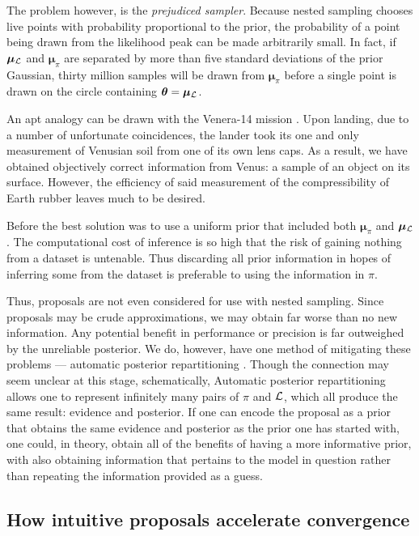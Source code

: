 \documentclass[draft,usenatbib]{mnras}
\begin{document}
The problem however, is the \emph{prejudiced sampler}. Because
nested sampling chooses live points with probability proportional
to the prior, the probability of a point being drawn from the
likelihood peak can be made arbitrarily small. In fact, if
\(\bm{\mu}_{{\cal L}}\) and \(\bm{\mu}_{\pi}\) are separated by more
than five standard deviations of the prior Gaussian, thirty million
samples will be drawn from \(\bm{\mu}_{\pi}\) before a single point
is drawn on the circle containing \(\bm{\theta} = \bm{\mu}_{{\cal
   L}}\).

An apt analogy can be drawn with the Venera-14 mission
\citep{siddiqi2018beyond}. Upon landing, due to a number of
unfortunate coincidences, the lander took its one and only
measurement of Venusian soil from one of its own lens caps. As a
result, we have obtained objectively correct information from
Venus: a sample of an object on its surface. However, the
efficiency of said measurement of the compressibility of Earth
rubber leaves much to be desired.

Before \cite{chen-ferroz-hobson} the best solution was to use a
uniform prior that included both \(\bm{\mu}_{\pi}\) and
\(\bm{\mu}_{{\cal L}}\). The computational cost of inference is so
high that the risk of gaining nothing from a dataset is
untenable. Thus discarding all prior information in hopes of
inferring some from the dataset is preferable to using the
information in \(\pi\).

Thus, proposals are not even considered for use with nested
sampling.  Since proposals may be crude approximations, we may
obtain far worse than no new information.  Any potential benefit in
performance or precision is far outweighed by the unreliable
posterior.  We do, however, have one method of mitigating these
problems --- automatic posterior repartitioning
\citep{chen-ferroz-hobson}. Though the connection may seem unclear
at this stage, schematically, Automatic posterior repartitioning
allows one to represent infinitely many pairs of \(\pi\) and
\({\cal L}\), which all produce the same result: evidence and
posterior. If one can encode the proposal as a prior that obtains
the same evidence and posterior as the prior one has started with,
one could, in theory, obtain all of the benefits of having a more
informative prior, with also obtaining information that pertains to
the model in question rather than repeating the information
provided as a guess.

\subsection{How intuitive proposals accelerate convergence}
\label{sec:orgcc977c0}
\end{document}
